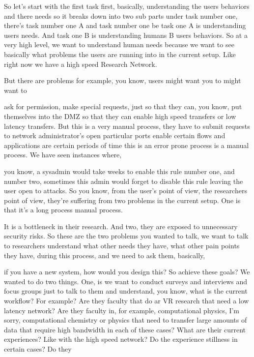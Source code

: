 So let's start with the first task first, basically, understanding the users behaviors and there needs so it breaks down into two sub parts under task number one, there's task number one A and task number one be task one A is understanding users needs. And task one B is understanding humans B users behaviors. So at a very high level, we want to understand human needs because we want to see basically what problems the users are running into in the current setup. Like right now we have a high speed Research Network.

But there are problems for example, you know, users might want you to might want to

ask for permission, make special requests, just so that they can, you know, put themselves into the DMZ so that they can enable high speed transfers or low latency transfers. But this is a very manual process, they have to submit requests to network administrator's open particular ports enable certain flows and applications are certain periods of time this is an error prone process is a manual process. We have seen instances where,

you know, a sysadmin would take weeks to enable this rule number one, and number two, sometimes this admin would forget to disable this rule leaving the user open to attacks. So you know, from the user's point of view, the researchers point of view, they're suffering from two problems in the current setup. One is that it's a long process manual process.

It is a bottleneck in their research. And two, they are exposed to unnecessary security risks. So these are the two problems you wanted to talk, we want to talk to researchers understand what other needs they have, what other pain points they have, during this process, and we need to ask them, basically,

if you have a new system, how would you design this? So achieve these goals? We wanted to do two things. One, is we want to conduct surveys and interviews and focus groups just to talk to them and understand, you know, what is the current workflow? For example? Are they faculty that do ar VR research that need a low latency network? Are they faculty in, for example, computational physics, I'm sorry, computational chemistry or physics that need to transfer large amounts of data that require high bandwidth in each of these cases? What are their current experiences? Like with the high speed network? Do the experience stillness in certain cases? Do they


